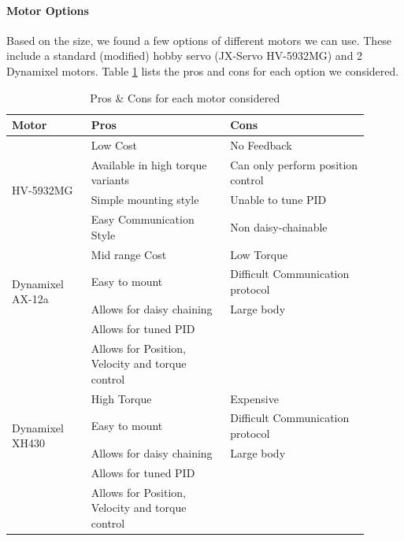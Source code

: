            \paragraph{Motor Options}
            Based on the size, we found a few options of different motors we can use. These include a standard (modified) hobby servo (JX-Servo HV-5932MG) and 2 Dynamixel motors. Table \ref{tab:MotorComparison} lists the pros and cons for each option we considered.

            \begin{table} [H]
                \centering
                    \begin{tabular}{|p{0.2\linewidth}|p{0.35\linewidth}|p{0.35\linewidth}|}
                        \hline
                        Motor & Pros & Cons \\
                        \hline
                        \multirow{4}{*}{HV-5932MG}& Low Cost  & No Feedback\\
                            & Available in high torque variants & Can only perform position control\\
                            & Simple mounting style & Unable to tune PID\\
                            & Easy Communication Style & Non daisy-chainable \\
                            \hline
                        \multirow{4}{*}{Dynamixel AX-12a}  & Mid range  Cost   &  Low Torque\\
                            & Easy to mount & Difficult Communication protocol \\
                            & Allows for daisy chaining & Large body\\
                            & Allows for tuned PID & \\
                            & Allows for Position, Velocity and torque control& \\
                            \hline
                        \multirow{4}{*}{Dynamixel XH430}  & High Torque  & Expensive\\
                            & Easy to mount & Difficult Communication protocol \\
                            & Allows for daisy chaining & Large body \\
                            & Allows for tuned PID & \\
                            & Allows for Position, Velocity and torque control& \\
                        \hline
                    \end{tabular}
                    \caption{Pros \& Cons for each motor considered}
                    \label{tab:MotorComparison}
                \end{table}
                
